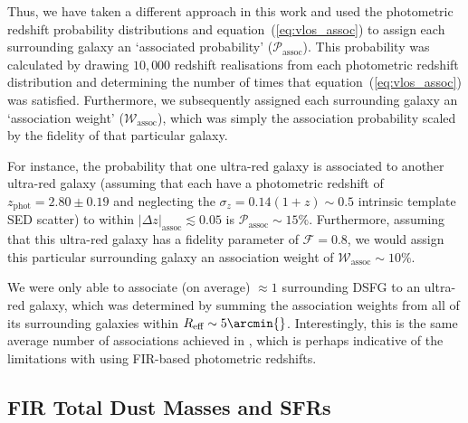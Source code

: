 \documentclass[a4paper, fleqn, usenatbib]{mnras}
\newcommand{\fidelity}{\mathcal{F}}
\newcommand{\reff}{R_{\text{eff}}}
\newcommand{\urg}{ultra-red galaxy}
\newcommand{\zphot}{z_{\text{phot}}}
\begin{document}
Thus, we have taken a different approach in this work and used the photometric redshift probability distributions and equation~(\ref{eq:vlos_assoc}) to assign each surrounding galaxy an `associated probability' ($\mathcal{P}_{\text{assoc}}$).
This probability was calculated by drawing $10{,}000$ redshift realisations from each photometric redshift distribution and determining the number of times that equation~(\ref{eq:vlos_assoc}) was satisfied.
Furthermore, we subsequently assigned each surrounding galaxy an `association weight' ($\mathcal{W}_{\text{assoc}}$), which was simply the association probability scaled by the fidelity of that particular galaxy.

For instance, the probability that one \urg{} is associated to another \urg{} (assuming that each have a photometric redshift of $\zphot=2.80\pm0.19$ and neglecting the $\sigma_{z}=0.14(1+z)\sim0.5$ intrinsic template SED scatter) to within $|\Delta z|_{\text{assoc}}\lesssim0.05$ is $\mathcal{P}_{\text{assoc}}\sim15\%$.
Furthermore, assuming that this \urg{} has a fidelity parameter of $\fidelity{}=0.8$, we would assign this particular surrounding galaxy an association weight of $\mathcal{W}_{\text{assoc}}\sim10\%$.

We were only able to associate (on average) $\approx1$ surrounding DSFG to an \urg{}, which was determined by summing the association weights from all of its surrounding galaxies within $\reff{}\sim5\arcmin{}$.
Interestingly, this is the same average number of associations achieved in , which is perhaps indicative of the limitations with using FIR-based photometric redshifts.

\subsection{FIR Total Dust Masses and SFRs}
\end{document}
